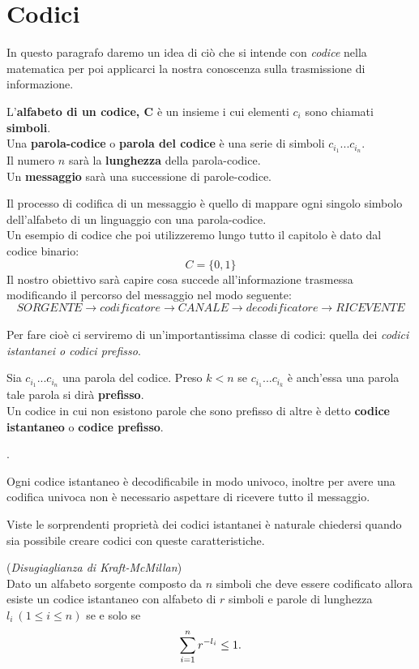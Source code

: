 \section{Codici}
\label{sec:Codici}
In questo paragrafo daremo un idea di ciò che si intende con \textit{codice} nella matematica per poi applicarci la nostra conoscenza sulla trasmissione di informazione.\\
\begin{defi}
L'\textbf{alfabeto di un codice, C} è un insieme \acode i cui elementi $c_i$ sono chiamati \textbf{simboli}.\\
Una \textbf{parola-codice} o \textbf{parola del codice} è una serie di simboli $c_{i_1}...c_{i_n}$.\\
Il numero $n$ sarà la \textbf{lunghezza} della parola-codice.\\
Un \textbf{messaggio} sarà una successione di parole-codice.
\end{defi}
Il processo di codifica di un messaggio è quello di mappare ogni singolo  simbolo dell'alfabeto di un linguaggio con una parola-codice.\\
Un esempio di codice che poi utilizzeremo lungo tutto il capitolo è dato dal codice binario:
$$C=\{0, 1 \}$$
Il nostro obiettivo sarà capire cosa succede all'informazione trasmessa modificando il percorso del messaggio nel modo seguente:
$$ SORGENTE \to codificatore \to CANALE \to decodificatore \to RICEVENTE$$
\\
Per fare cioè ci serviremo di un'importantissima classe di codici: quella dei \textit{codici istantanei o codici prefisso}.
\begin{defi}
Sia $c_{i_1}...c_{i_n}$ una parola del codice. Preso $k<n$ se  $c_{i_1}...c_{i_k}$
è anch'essa una parola tale parola si dirà \textbf{prefisso}.\\
Un codice in cui non esistono parole che sono prefisso di altre è detto \textbf{codice istantaneo} o \textbf{codice prefisso}.
\end{defi}.
\begin{lem}
Ogni codice istantaneo è decodificabile in modo univoco, inoltre per avere una codifica univoca non è necessario aspettare di ricevere tutto il messaggio.
\end{lem}

Viste le sorprendenti proprietà dei codici istantanei è naturale chiedersi quando sia possibile creare codici con queste caratteristiche.

\begin{teo} \label{teo:disugKM} (\textit{Disugiaglianza di Kraft-McMillan})\\
Dato un alfabeto sorgente composto da $n$ simboli che deve essere codificato allora esiste un codice istantaneo con alfabeto di $r$ simboli e parole di lunghezza $l_i \ (1 \leq i \leq n)$ se e solo se 
\begin{equation} \label{eq:disugKM}
\sum_{i=1}^n r^{-l_i}\leq 1.
\end{equation} 
\end{teo}


